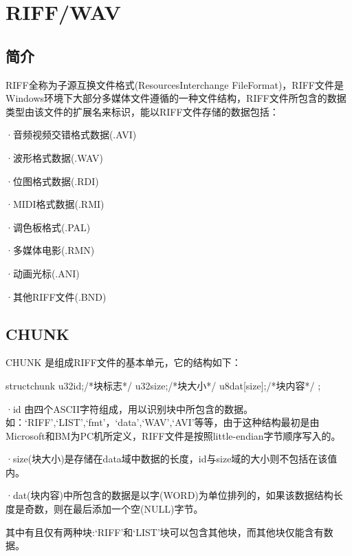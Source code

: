 \section{RIFF/WAV}

\subsection{简介}

RIFF全称为子源互换文件格式(ResourcesInterchange FileFormat)，RIFF文件是Windows环境下大部分多媒体文件遵循的一种文件结构，RIFF文件所包含的数据类型由该文件的扩展名来标识，能以RIFF文件存储的数据包括：



·音频视频交错格式数据(.AVI)



·波形格式数据(.WAV)



·位图格式数据(.RDI)



·MIDI格式数据(.RMI)



·调色板格式(.PAL)



·多媒体电影(.RMN)



·动画光标(.ANI)



·其他RIFF文件(.BND)


\subsection{CHUNK}

CHUNK 是组成RIFF文件的基本单元，它的结构如下：



structchunk{
  u32id;/*块标志*/
  u32size;/*块大小*/
  u8dat[size];/*块内容*/
};



·id 由四个ASCII字符组成，用以识别块中所包含的数据。如：‘RIFF’,‘LIST’,‘fmt’，‘data’,‘WAV’,‘AVI’等等，由于这种结构最初是由Microsoft和BM为PC机所定义，RIFF文件是按照little-endian字节顺序写入的。


·size(块大小)是存储在data域中数据的长度，id与size域的大小则不包括在该值内。


·dat(块内容)中所包含的数据是以字(WORD)为单位排列的，如果该数据结构长度是奇数，则在最后添加一个空(NULL)字节。



其中有且仅有两种块:‘RIFF’和‘LIST’块可以包含其他块，而其他块仅能含有数据。

